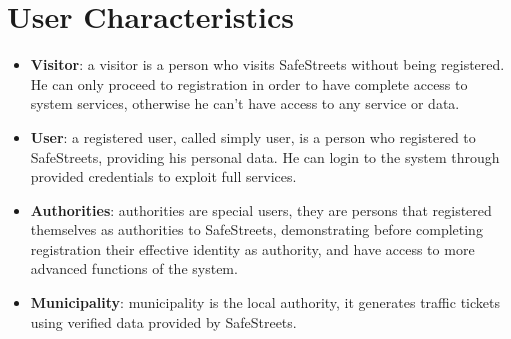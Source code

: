 \section{User Characteristics}
\begin{itemize}
  \item \textbf{Visitor}: a visitor is a person who visits SafeStreets without being registered. He can only proceed to registration in order to have complete access to system services, otherwise he can't have access to any service or data.
  \item \textbf{User}: a registered user, called simply user, is a person who registered to SafeStreets, providing his personal data. He can login to the system through provided credentials to exploit full services.
  \item \textbf{Authorities}: authorities are special users, they are persons that registered themselves as authorities to SafeStreets, demonstrating before completing registration their effective identity as authority, and have access to more advanced functions of the system.
  \item \textbf{Municipality}: municipality is the local authority, it generates traffic tickets using verified data provided by SafeStreets.
\end{itemize}